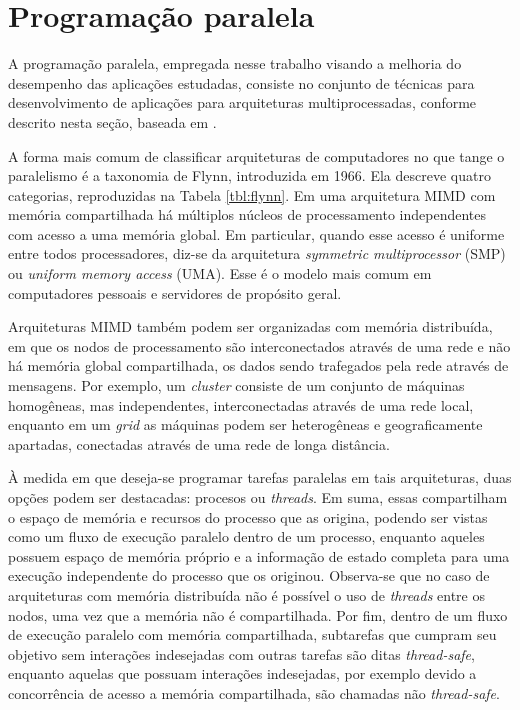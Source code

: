 \documentclass[cic,tc]{iiufrgs}
\begin{document}
\section{Programação paralela}
\label{sec:par}

A programação paralela, empregada nesse trabalho visando a melhoria do
desempenho das aplicações estudadas, consiste no conjunto de técnicas para
desenvolvimento de aplicações para arquiteturas multiprocessadas, conforme
descrito nesta seção, baseada em \cite{el2005advanced}.

A forma mais comum de classificar arquiteturas de computadores no que tange o
paralelismo é a taxonomia de Flynn, introduzida em 1966. Ela descreve quatro
categorias, reproduzidas na Tabela \ref{tbl:flynn}. Em uma arquitetura MIMD com
memória compartilhada há múltiplos núcleos de processamento independentes com
acesso a uma memória global. Em particular, quando esse acesso é uniforme entre
todos processadores, diz-se da arquitetura \textit{symmetric multiprocessor}
(SMP) ou \textit{uniform memory access} (UMA). Esse é o modelo mais comum em
computadores pessoais e servidores de propósito geral.

Arquiteturas MIMD também podem ser organizadas com memória distribuída, em que
os nodos de processamento são interconectados através de uma rede e não há
memória global compartilhada, os dados sendo trafegados pela rede através de
mensagens. Por exemplo, um \textit{cluster} consiste de um conjunto de máquinas
homogêneas, mas independentes, interconectadas através de uma rede local,
enquanto em um \textit{grid} as máquinas podem ser heterogêneas e
geograficamente apartadas, conectadas através de uma rede de longa distância.

À medida em que deseja-se programar tarefas paralelas em tais arquiteturas,
duas opções podem ser destacadas: procesos ou \textit{threads}. Em suma, essas
compartilham o espaço de memória e recursos do processo que as origina, podendo
ser vistas como um fluxo de execução paralelo dentro de um processo, enquanto
aqueles possuem espaço de memória próprio e a informação de estado completa
para uma execução independente do processo que os originou. Observa-se que no
caso de arquiteturas com memória distribuída não é possível o uso de
\textit{threads} entre os nodos, uma vez que a memória não é compartilhada.
Por fim, dentro de um fluxo de execução paralelo com memória compartilhada,
subtarefas que cumpram seu objetivo sem interações indesejadas com outras
tarefas são ditas \textit{thread-safe}, enquanto aquelas que possuam interações
indesejadas, por exemplo devido a concorrência de acesso a memória
compartilhada, são chamadas não \textit{thread-safe}.
\end{document}
